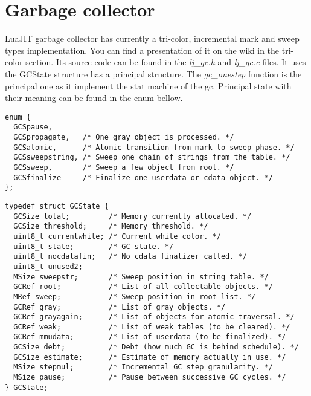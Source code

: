 
\section{Garbage collector}
\label{Sec:gc}

LuaJIT garbage collector has currently a tri-color, incremental mark and sweep
types implementation. You can find a presentation of it on the wiki
\cite{luajit-gc} in the tri-color section. Its source code can be found in the
\emph{lj\_gc.h} and \emph{lj\_gc.c} files. It uses the GCState structure has a
principal structure. The \emph{gc\_onestep} function is the principal one as it
implement the stat machine of the gc. Principal state with their meaning can be
found in the enum bellow.

\begin{lstlisting}[style=CStyle]
enum {
  GCSpause,
  GCSpropagate,   /* One gray object is processed. */
  GCSatomic,      /* Atomic transition from mark to sweep phase. */
  GCSsweepstring, /* Sweep one chain of strings from the table. */
  GCSsweep,       /* Sweep a few object from root. */
  GCSfinalize     /* Finalize one userdata or cdata object. */
};
\end{lstlisting}

\begin{lstlisting}[style=CStyle]
typedef struct GCState {
  GCSize total;         /* Memory currently allocated. */
  GCSize threshold;     /* Memory threshold. */
  uint8_t currentwhite; /* Current white color. */
  uint8_t state;        /* GC state. */
  uint8_t nocdatafin;   /* No cdata finalizer called. */
  uint8_t unused2;
  MSize sweepstr;       /* Sweep position in string table. */
  GCRef root;           /* List of all collectable objects. */
  MRef sweep;           /* Sweep position in root list. */
  GCRef gray;           /* List of gray objects. */
  GCRef grayagain;      /* List of objects for atomic traversal. */
  GCRef weak;           /* List of weak tables (to be cleared). */
  GCRef mmudata;        /* List of userdata (to be finalized). */
  GCSize debt;          /* Debt (how much GC is behind schedule). */
  GCSize estimate;      /* Estimate of memory actually in use. */
  MSize stepmul;        /* Incremental GC step granularity. */
  MSize pause;          /* Pause between successive GC cycles. */
} GCState;
\end{lstlisting}

